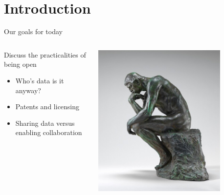 \section{Introduction}
\label{sec:introduction}

\begin{frame}{Our goals for today}
    
    \begin{columns}[c]
        \begin{column}{.45\textwidth}
        
        Discuss the practicalities of being open
        
            \begin{itemize}
                \item Who's data is it anyway?
                \item Patents and licensing
                \item Sharing data versus enabling collaboration
            \end{itemize}
        \end{column}
        
        \begin{column}{.45\textwidth}
            \includegraphics[width=0.8\textwidth]{images/the_thinker_NPA_1942_5_12.jpg}
            
        \end{column}
    \end{columns}
    
\end{frame}

